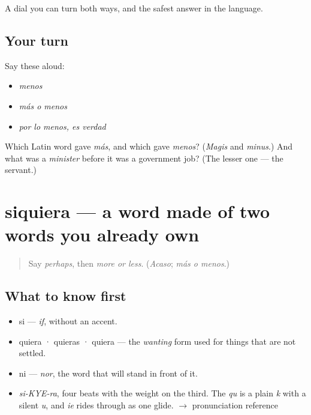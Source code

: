 \begin{grammarlens}[title={What you've built}]
A dial you can turn both ways, and the safest answer in the language.
\end{grammarlens}

\subsection*{Your turn}
Say these aloud:

\begin{itemize}
\raggedright
  \item \emph{menos}
  \item \emph{más o menos}
  \item \emph{por lo menos, es verdad}
\end{itemize}

\begin{tcolorbox}[breakable,colback=teal!4,colframe=teal!35!black,title={Before you move on}]
Which Latin word gave \emph{más}, and which gave \emph{menos}? (\emph{Magis} and \emph{minus}.) And what was a \emph{minister} before it was a government job? (The lesser one — the servant.)
\end{tcolorbox}
\section[siquiera]{siquiera — a word made of two words you already own}

\label{lesson:ES-C324-siquiera}



\begin{quote}
Say \emph{perhaps}, then \emph{more or less}. (\emph{Acaso}; \emph{más o menos}.)
\end{quote}

\subsection*{What to know first}
\begin{itemize}
\raggedright
  \item si — \emph{if}, without an accent.
  \item quiera · quieras · quiera — the \emph{wanting} form used for things that are not settled.
  \item ni — \emph{nor}, the word that will stand in front of it.
\end{itemize}

\begin{sounds}
\begin{itemize}
\raggedright
  \item \emph{si-KYE-ra}, four beats with the weight on the third. The \emph{qu} is a plain \emph{k} with a silent \emph{u}, and \emph{ie} rides through as one glide. $\to$ pronunciation reference
\end{itemize}
\end{sounds}

